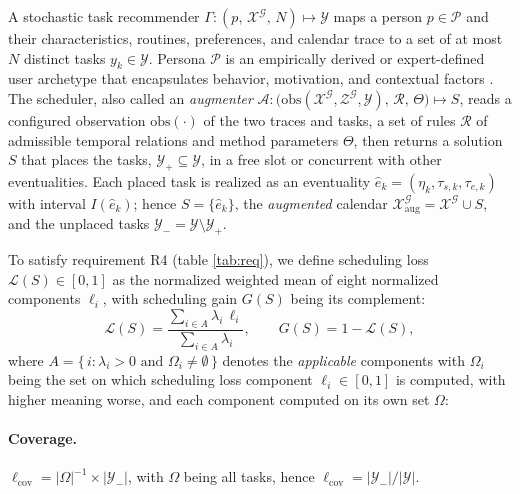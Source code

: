 \documentclass[runningheads]{llncs}
\begin{document}
A stochastic task recommender $\Gamma : (p,\,\mathcal{X}^{\mathcal{G}},\,N)\longmapsto\mathcal{Y}$ maps a person $p\in\mathcal{P}$ and  their characteristics, routines, preferences, and calendar trace to a set of at most $N$ distinct tasks $y_k\in\mathcal{Y}$. Persona $\mathcal{P}$ is an empirically derived or expert-defined user archetype that encapsulates behavior, motivation, and contextual factors \citep{bartels_using_2023}. The scheduler, also called an \emph{augmenter} $\mathcal{A} : \bigl(\mathrm{obs}(\mathcal{X}^{\mathcal{G}},\mathcal{Z}^{\mathcal{G}},\mathcal{Y}),\,\mathcal{R},\,\Theta\bigr)\longmapsto S$, reads a configured observation $\mathrm{obs}(\cdot)$ of the two traces and tasks, a set of rules $\mathcal{R}$ of admissible temporal relations and method parameters $\Theta$, then returns a solution $S$ that places the tasks, $\mathcal{Y}_{+}\subseteq\mathcal{Y}$, in a free slot or concurrent with other eventualities.
Each placed task is realized as an eventuality $\hat{e}_k=(\eta_k,\tau_{s,k},\tau_{e,k})$ with interval $I(\hat{e}_k)$; hence $S=\{\hat{e}_k\}$, the \textit{augmented} calendar $\mathcal{X}^{\mathcal{G}}_{\mathrm{aug}}=\mathcal{X}^{\mathcal{G}}\cup S$, and the unplaced tasks $\mathcal{Y}_{-}=\mathcal{Y}\setminus\mathcal{Y}_{+}$. 

To satisfy requirement R4 (table  \ref{tab:req}), we define scheduling loss $\mathcal{L}(S)\in[0,1]$ as the normalized weighted mean of eight normalized components $\ell_i$, with scheduling gain $G(S)$ being its complement:
\begin{equation}
\mathcal{L}(S) = \frac{\sum_{i\in A}\lambda_i\,\ell_i}{\sum_{i\in A}\lambda_i},
\qquad G(S)=1-\mathcal{L}(S),
\label{eq:loss}
\end{equation}
where $A=\{\,i:\lambda_i>0 \text{ and } \Omega_i\neq\emptyset\,\}$ denotes the \emph{applicable} components with $\Omega_i$ being the set on which scheduling loss component $\ell_i\in[0,1]$ is computed, with higher meaning worse, and each component computed on its own set $\Omega$:

\paragraph{Coverage.} $\ell_{\mathrm{cov}} ={|\Omega|^{-1}\times|\mathcal{Y}_-|}$, with $\Omega$ being all tasks, hence  $\ell_{\mathrm{cov}} = |\mathcal{Y}_-|/|\mathcal{Y}|$.
\end{document}
